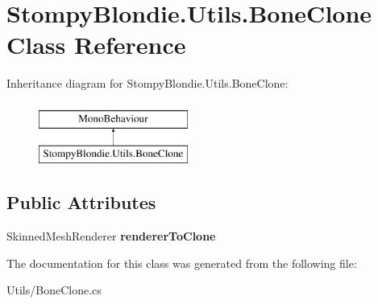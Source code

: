 \hypertarget{class_stompy_blondie_1_1_utils_1_1_bone_clone}{}\section{Stompy\+Blondie.\+Utils.\+Bone\+Clone Class Reference}
\label{class_stompy_blondie_1_1_utils_1_1_bone_clone}
Inheritance diagram for Stompy\+Blondie.\+Utils.\+Bone\+Clone\+:\begin{figure}[H]
\begin{center}
\leavevmode
\includegraphics[height=2.000000cm]{class_stompy_blondie_1_1_utils_1_1_bone_clone}
\end{center}
\end{figure}
\subsection*{Public Attributes}
\begin{DoxyCompactItemize}
\item 
\mbox{\label{class_stompy_blondie_1_1_utils_1_1_bone_clone_a2003810e13282194ef8aae44d587a9ab}} 
Skinned\+Mesh\+Renderer {\bfseries renderer\+To\+Clone}
\end{DoxyCompactItemize}


The documentation for this class was generated from the following file\+:\begin{DoxyCompactItemize}
\item 
Utils/Bone\+Clone.\+cs\end{DoxyCompactItemize}
